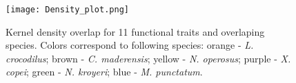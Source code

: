 \begin{figure} [!htbp]
	\begin{center}
		\texttt{[image: Density\_plot.png]}
	\end{center}
	\caption{Kernel density overlap for 11 functional traits and overlaping species. Colors correspond to following species: orange - \textit{L. crocodilus}; brown - \textit{C. maderensis}; yellow - \textit{N. operosus}; purple - \textit{X. copei}; green - \textit{N. kroyeri}; blue - \textit{M. punctatum}.}
	\label{fig:dpo}
\end{figure}